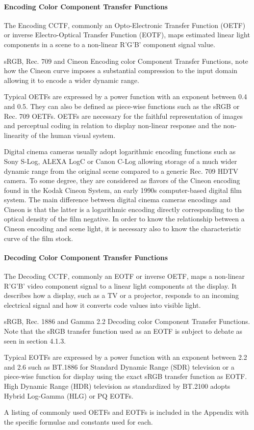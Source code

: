 \paragraph{Encoding Color Component Transfer Functions}%
\label{par:encoding-color-component-transfer-functions}

The Encoding CCTF, commonly an Opto-Electronic Transfer Function (OETF) or inverse Electro-Optical Transfer Function (EOTF), maps estimated linear light components in a scene to a non-linear R'G'B' component signal value.

sRGB, Rec. 709 and Cineon Encoding color Component Transfer Functions, note how the Cineon curve imposes a substantial compression to the input domain allowing it to encode a wider dynamic range.

Typical OETFs are expressed by a power function with an exponent between 0.4 and 0.5. They can also be defined as piece-wise functions such as the sRGB or Rec. 709 OETFs. OETFs are necessary for the faithful representation of images and perceptual coding in relation to display non-linear response and the non-linearity of the human visual system.

Digital cinema cameras usually adopt logarithmic encoding functions such as Sony S-Log, ALEXA LogC or Canon C-Log allowing storage of a much wider dynamic range from the original scene compared to a generic Rec. 709 HDTV camera. To some degree, they are considered as flavors of the Cineon encoding found in the Kodak Cineon System, an early 1990s computer-based digital film system. The main difference between digital cinema cameras encodings and Cineon is that the latter is a logarithmic encoding directly corresponding to the optical density of the film negative. In order to know the relationship between a Cineon encoding and scene light, it is necessary also to know the characteristic curve of the film stock.


\paragraph{Decoding Color Component Transfer Functions}%
\label{par:decoding-color-component-transfer-functions}

The Decoding CCTF, commonly an EOTF or inverse OETF, maps a non-linear R'G'B' video component signal to a linear light components at the display. It describes how a display, such as a TV or a projector, responds to an incoming electrical signal and how it converts code values into visible light.


sRGB, Rec. 1886 and Gamma 2.2 Decoding color Component Transfer Functions. Note that the sRGB transfer function used as an EOTF is subject to debate as seen in section 4.1.3.

Typical EOTFs are expressed by a power function with an exponent between 2.2 and 2.6 such as BT.1886 for Standard Dynamic Range (SDR) television or a piece-wise function for display using the exact sRGB transfer function as EOTF. High Dynamic Range (HDR) television as standardized by BT.2100 adopts Hybrid Log-Gamma (HLG) or PQ EOTFs.

A listing of commonly used OETFs and EOTFs is included in the Appendix with the specific formulae and constants used for each.

